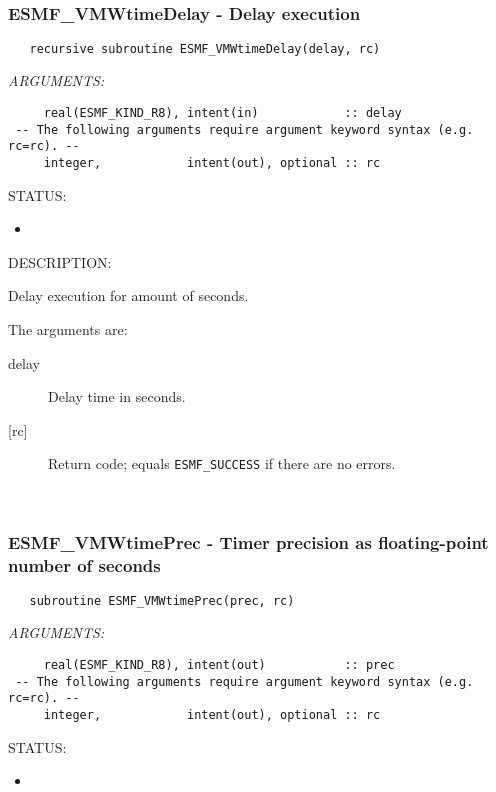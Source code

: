  
\mbox{}\hrulefill\ 
 
\subsubsection [ESMF\_VMWtimeDelay] {ESMF\_VMWtimeDelay - Delay execution}


 
\begin{verbatim}   recursive subroutine ESMF_VMWtimeDelay(delay, rc)\end{verbatim}{\em ARGUMENTS:}
\begin{verbatim}     real(ESMF_KIND_R8), intent(in)            :: delay
 -- The following arguments require argument keyword syntax (e.g. rc=rc). --
     integer,            intent(out), optional :: rc\end{verbatim}
{\sf STATUS:}
   \begin{itemize}
   \item{}
   \end{itemize}
  
{\sf DESCRIPTION:\\ }


     Delay execution for amount of seconds.
  
     The arguments are:
     \begin{description}
     \item[delay] 
          Delay time in seconds.
     \item[{[rc]}] 
          Return code; equals {\tt ESMF\_SUCCESS} if there are no errors.
     \end{description}
   
 
\mbox{}\hrulefill\ 
 
\subsubsection [ESMF\_VMWtimePrec] {ESMF\_VMWtimePrec - Timer precision as floating-point number of seconds}


 
\begin{verbatim}   subroutine ESMF_VMWtimePrec(prec, rc)\end{verbatim}{\em ARGUMENTS:}
\begin{verbatim}     real(ESMF_KIND_R8), intent(out)           :: prec
 -- The following arguments require argument keyword syntax (e.g. rc=rc). --
     integer,            intent(out), optional :: rc\end{verbatim}
{\sf STATUS:}
   \begin{itemize}
   \item{}
   \end{itemize}
  
